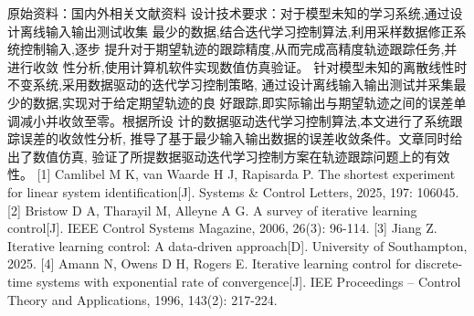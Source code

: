 \assignReq
{原始资料：国内外相关文献资料 }
{设计技术要求：对于模型未知的学习系统,通过设计离线输入输出测试收集}
{最少的数据,结合迭代学习控制算法,利用采样数据修正系统控制输入,逐步}
{提升对于期望轨迹的跟踪精度,从而完成高精度轨迹跟踪任务,并进行收敛}
{性分析,使用计算机软件实现数值仿真验证。}
\assignWork
{针对模型未知的离散线性时不变系统,采用数据驱动的迭代学习控制策略,}
{通过设计离线输入输出测试并采集最少的数据,实现对于给定期望轨迹的良}
{好跟踪,即实际输出与期望轨迹之间的误差单调减小并收敛至零。根据所设}
{计的数据驱动迭代学习控制算法,本文进行了系统跟踪误差的收敛性分析,}
{推导了基于最少输入输出数据的误差收敛条件。文章同时给出了数值仿真,}
{验证了所提数据驱动迭代学习控制方案在轨迹跟踪问题上的有效性。}
\assignRef
{[1] Camlibel M K, van Waarde H J, Rapisarda P. The shortest experiment for}
{linear system identification[J]. Systems \& Control Letters, 2025, 197: 106045.}
{[2] Bristow D A, Tharayil M, Alleyne A G. A survey of iterative learning}
{control[J]. IEEE Control Systems Magazine, 2006, 26(3): 96-114.}
{[3] Jiang Z. Iterative learning control: A data-driven approach[D]. University}
{of Southampton, 2025.}
{[4] Amann N, Owens D H, Rogers E. Iterative learning control for discrete-time}
{systems with exponential rate of convergence[J]. IEE Proceedings -- Control}
{Theory and Applications, 1996, 143(2): 217-224.}